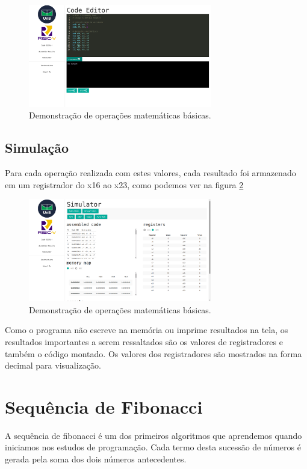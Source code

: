 	\begin{figure}[h]
	  \centering
	  \includegraphics[width=8cm]{img/aritmetica_codigo.png}
	  \caption{Demonstração de operações matemáticas básicas.}
	  \label{fig:operacoes_matematicas_codigo}
	\end{figure}


\subsection{Simulação}
	
	Para cada operação realizada com estes valores, cada resultado foi armazenado em um registrador do x16 ao x23, como podemos ver na figura \ref{fig:operacoes_matematicas_resultados}

	\begin{figure}[h]
	  \centering
	  \includegraphics[width=8cm]{img/aritmetica_results.png}
	  \caption{Demonstração de operações matemáticas básicas.}
	  \label{fig:operacoes_matematicas_resultados}
	\end{figure}

	Como o programa não escreve na memória ou imprime resultados na tela, os resultados importantes a serem ressaltados são os valores de registradores e também o código montado. Os valores dos registradores são mostrados na forma decimal para visualização.


\section{Sequência de Fibonacci}
	
	A sequência de fibonacci é um dos primeiros algoritmos que aprendemos quando iniciamos nos estudos de programação. Cada termo desta sucessão de números é gerada pela soma dos dois números antecedentes.

